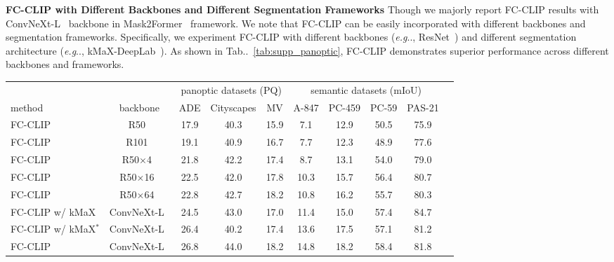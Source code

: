 \documentclass{article}
\makeatletter
\DeclareRobustCommand\onedot{\futurelet\@let@token\@onedot}
\def\@onedot{\ifx\@let@token.\else.\null\fi\xspace}
\def\eg{\emph{e.g}\onedot}
\newcommand{\tabref}[1]{Tab\onedot~\ref{#1}}
\newcommand{\modelname}{FC-CLIP\xspace}
\newcommand{\tablestyle}[2]{\setlength{\tabcolsep}{#1}\renewcommand{\arraystretch}{#2}\centering\footnotesize}
\makeatother
\begin{document}
\noindent \textbf{\modelname with Different Backbones and Different Segmentation Frameworks}\quad
Though we majorly report \modelname results with ConvNeXt-L~\cite{liu2022convnet,radford2021learning} backbone in Mask2Former~\cite{cheng2021masked} framework. We note that \modelname can be easily incorporated with different backbones and segmentation frameworks. Specifically, we experiment \modelname with different backbones (\eg, ResNet~\cite{he2016deep}) and different segmentation architecture (\eg, kMaX-DeepLab~\cite{yu2022k}). As shown in \tabref{tab:supp_panoptic}, \modelname demonstrates superior performance across different backbones and frameworks.

\begin{table*}[!t]
\small
\centering
\tablestyle{4pt}{1.05}
\caption{
    \label{tab:supp_panoptic}
    \textbf{Open-vocabulary segmentation performance with different backbones and segmentation frameworks.} All models are trained on COCO and tested on the other datasets in a zero-shot manner. MV: Mapillary Vistas. $*$: kMaX-DeepLab with multi-scale deformable attention~\cite{zhu2020deformable}
}
\begin{tabular}{l|c|ccc|ccccc}
                           & \multicolumn{1}{c|}{} & \multicolumn{3}{c|}{panoptic datasets (PQ)}   & \multicolumn{4}{c}{semantic datasets (mIoU)}                                \\
method      & backbone                & ADE            & Cityscapes   & MV   & A-847 & PC-459 & PC-59 & PAS-21             \\
\shline
\modelname & R50~\cite{he2016deep,radford2021learning}   & 17.9 & 40.3 & 15.9  & 7.1 & 12.9 & 50.5 & 75.9 \\
\modelname & R101~\cite{he2016deep,radford2021learning}   & 19.1 & 40.9 & 16.7  & 7.7 & 12.3 & 48.9 & 77.6 \\
\modelname & R50$\times$4~\cite{radford2021learning}    & 21.8 & 42.2 & 17.4  & 8.7 & 13.1 & 54.0 & 79.0 \\
\modelname & R50$\times$16~\cite{radford2021learning}    & 22.5 & 42.0 & 17.8  & 10.3 & 15.7 & 56.4 & 80.7 \\
\modelname  & R50$\times$64~\cite{radford2021learning}   & 22.8 & 42.7 & 18.2  & 10.8 & 16.2 & 55.7 & 80.3  \\
\hline 
\modelname w/ kMaX & ConvNeXt-L~\cite{liu2022convnet,ilharco_gabriel_2021_5143773}    & 24.5 & 43.0 & 17.0 & 11.4 & 15.0 & 57.4 & 84.7 \\
\modelname w/ kMaX$^*$ & ConvNeXt-L~\cite{liu2022convnet,ilharco_gabriel_2021_5143773}  & 26.4 & 40.2 & 17.4 & 13.6  & 17.5 & 57.1  & 81.2 \\
\hline 
\modelname & ConvNeXt-L~\cite{liu2022convnet,ilharco_gabriel_2021_5143773}   & 26.8 & 44.0 & 18.2  & 14.8 & 18.2 & 58.4 & 81.8 \\

\end{tabular}
\end{table*}
\end{document}
